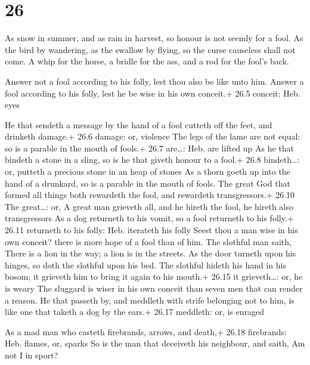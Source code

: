 \hypertarget{section-25}{%
\section{26}\label{section-25}}

 As snow in summer, and as rain in harvest, so honour is not
seemly for a fool.  As the bird by wandering, as the swallow
by flying, so the curse causeless shall not come.  A whip
for the horse, a bridle for the ass, and a rod for the fool's back.

 Answer not a fool according to his folly, lest thou also be
like unto him.  Answer a fool according to his folly, lest
he be wise in his own conceit.+ 26.5 conceit: Heb. eyes

 He that sendeth a message by the hand of a fool cutteth off
the feet, and drinketh damage.+ 26.6 damage: or, violence 
The legs of the lame are not equal: so is a parable in the mouth of
fools.+ 26.7 are\ldots: Heb. are lifted up  As he that
bindeth a stone in a sling, so is he that giveth honour to a fool.+ 26.8
bindeth\ldots: or, putteth a precious stone in an heap of stones
 As a thorn goeth up into the hand of a drunkard, so is a
parable in the mouth of fools.  The great God that formed
all things both rewardeth the fool, and rewardeth transgressors.+ 26.10
The great\ldots: or, A great man grieveth all, and he hireth the fool,
he hireth also transgressors  As a dog returneth to his
vomit, so a fool returneth to his folly.+ 26.11 returneth to his folly:
Heb. iterateth his folly  Seest thou a man wise in his own
conceit? there is more hope of a fool than of him.  The
slothful man saith, There is a lion in the way; a lion is in the
streets.  As the door turneth upon his hinges, so doth the
slothful upon his bed.  The slothful hideth his hand in his
bosom; it grieveth him to bring it again to his mouth.+ 26.15 it
grieveth\ldots: or, he is weary  The sluggard is wiser in
his own conceit than seven men that can render a reason. 
He that passeth by, and meddleth with strife belonging not to him, is
like one that taketh a dog by the ears.+ 26.17 meddleth: or, is enraged

 As a mad man who casteth firebrands, arrows, and death,+
26.18 firebrands: Heb. flames, or, sparks  So is the man
that deceiveth his neighbour, and saith, Am not I in sport?

